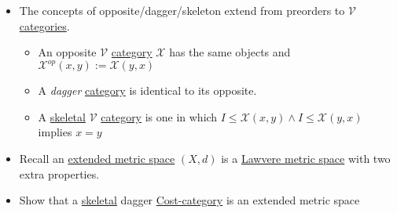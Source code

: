 \begin{itemize}
    \item  The concepts of opposite/dagger/skeleton extend from preorders to $\mathcal{V}$ \href{doc/1 math/Seven Sketches in Compositionality/Chapter 2: Resource theories/3 Enrichment/1 V-categories/1 V-category}{categories}.
          \begin{itemize}
            \item An opposite $\mathcal{V}$ \href{doc/1 math/Seven Sketches in Compositionality/Chapter 2: Resource theories/3 Enrichment/1 V-categories/1 V-category}{category} $\mathcal{X}$ has the same objects and $\mathcal{X}^{op}(x,y):=\mathcal{X}(y,x)$
            \item A \emph{dagger} \href{doc/1 math/Seven Sketches in Compositionality/Chapter 2: Resource theories/3 Enrichment/1 V-categories/1 V-category}{category} is identical to its opposite.
            \item A \href{doc/1 math/Seven Sketches in Compositionality/Chapter 1: Generative Effects/3 Preorders/Skeletality}{skeletal} $\mathcal{V}$ \href{doc/1 math/Seven Sketches in Compositionality/Chapter 2: Resource theories/3 Enrichment/1 V-categories/1 V-category}{category} is one in which $I \leq \mathcal{X}(x,y) \land I \leq \mathcal{X}(y,x)$ implies $x = y$
          \end{itemize}
    \item Recall an \href{doc/1 math/Seven Sketches in Compositionality/Chapter 2: Resource theories/3 Enrichment/3 Lawvere metric spaces/1 Metric space}{extended metric space} $(X,d)$ is a \href{doc/1 math/Seven Sketches in Compositionality/Chapter 2: Resource theories/3 Enrichment/3 Lawvere metric spaces/2 Lawvere metric space}{Lawvere metric space} with two extra properties.
    \item Show that a \href{doc/1 math/Seven Sketches in Compositionality/Chapter 1: Generative Effects/3 Preorders/Skeletality}{skeletal} dagger \href{doc/1 math/Seven Sketches in Compositionality/Chapter 2: Resource theories/3 Enrichment/3 Lawvere metric spaces/2 Lawvere metric space}{Cost-category} is an extended metric space

  \end{itemize}
